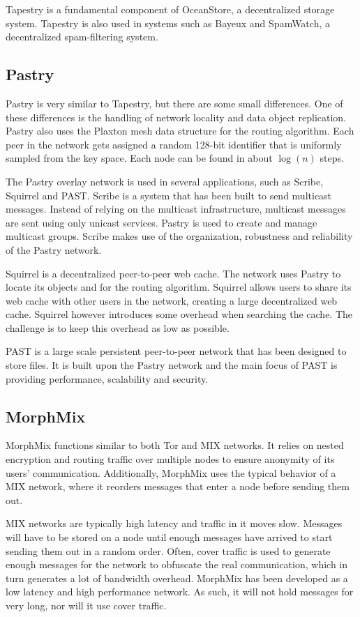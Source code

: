 \documentclass{article}
\begin{document}
		Tapestry is a fundamental component of OceanStore, a decentralized storage system. Tapestry is also used in systems such as Bayeux and SpamWatch, a decentralized spam-filtering system.

	\subsection{Pastry} %
		Pastry is very similar to Tapestry, but there are some small differences. One of these differences is the handling of network locality and data object replication. Pastry also uses the Plaxton mesh data structure for the routing algorithm. Each peer in the network gets assigned a random 128-bit identifier that is uniformly sampled from the key space. Each node can be found in about $\log(n)$ steps.

		The Pastry overlay network is used in several applications, such as Scribe, Squirrel and PAST. Scribe is a system that has been built to send multicast messages. Instead of relying on the multicast infrastructure, multicast messages are sent using only unicast services. Pastry is used to create and manage multicast groups. Scribe makes use of the organization, robustness and reliability of the Pastry network.

		Squirrel is a decentralized peer-to-peer web cache. The network uses Pastry to locate its objects and for the routing algorithm. Squirrel allows users to share its web cache with other users in the network, creating a large decentralized web cache. Squirrel however introduces some overhead when searching the cache. The challenge is to keep this overhead as low as possible.

		PAST is a large scale persistent peer-to-peer network that has been designed to store files. It is built upon the Pastry network and the main focus of PAST is providing performance, scalability and security.
			
	\subsection{MorphMix} %
		MorphMix \cite{rennhard2002introducing} functions similar to both Tor and MIX networks. It relies on nested encryption and routing traffic over multiple nodes to ensure anonymity of its users' communication. Additionally, MorphMix uses the typical behavior of a MIX network, where it reorders messages that enter a node before sending them out.
		
		MIX networks are typically high latency and traffic in it moves slow. Messages will have to be stored on a node until enough messages have arrived to start sending them out in a random order. Often, cover traffic is used to generate enough messages for the network to obfuscate the real communication, which in turn generates a lot of bandwidth overhead. MorphMix has been developed as a low latency and high performance network. As such, it will not hold messages for very long, nor will it use cover traffic.
		
\end{document}

